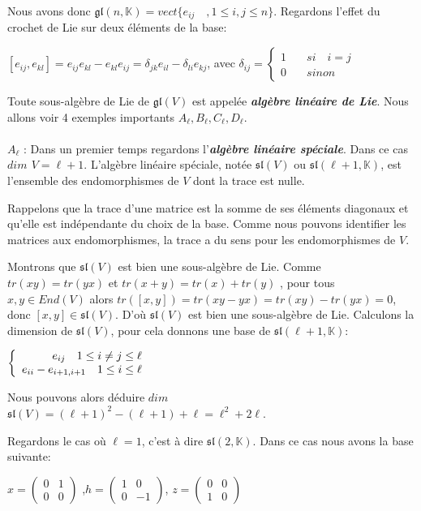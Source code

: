 \documentclass[a4paper,openany,12pt]{report}
\newcommand{\KK}{\mathbb{K}}
\newcommand{\gl}{\mathfrak{gl}}
\newcommand{\ssl}{\mathfrak{sl}}
\theoremstyle{break}
{\theorembodyfont{\upshape}
\newtheorem*{rmq}{Remarque :}
\newtheorem*{prv}{Preuve :}
\newtheorem*{ex}{Exemples :}
\newtheorem{exe}{Exemple : }
\newtheorem*{nota}{Notation :}}
\begin{document}
Nous avons donc $\gl(n,\KK)=vect\{ { e_{ij} \quad , 1\leq i , j \leq n }\}$. Regardons l'effet du crochet de Lie sur deux éléments de la base:
\begin{center}
$ [ e_{ij},e_{kl} ] = e_{ij} e_{kl} - e_{kl} e_{ij}  = \delta_{jk}e_{il}  -  \delta_{li}e_{kj} $, avec 
$ \delta_{ij} = \left \{
\begin{aligned}
1 & \quad si \quad i=j\\
0 & \quad sinon
\end{aligned}
\right. $
\end{center}
\quad Toute sous-algèbre de Lie de $\gl(V)$ est appelée \emph{\textbf{algèbre linéaire de Lie}}. Nous allons voir 4 exemples importants  $A_{\ell}, B_{\ell}, C_{\ell}, D_{\ell}$.\\
\\
$ A_{\ell} $ : Dans un premier temps regardons l'\emph{\textbf{algèbre linéaire spéciale}}. Dans ce cas \textbf{$dim$ $V= \ell +1$}. L'algèbre linéaire spéciale, notée $\ssl(V)$ ou $\ssl(\ell+1,\KK)$, est l'ensemble des endomorphismes de $V$ dont la trace est nulle.

Rappelons que la trace d'une matrice est la somme de ses éléments diagonaux et qu'elle est indépendante du choix de la base. Comme nous pouvons identifier les matrices aux endomorphismes, la trace a du sens pour les endomorphismes de $V$.

Montrons que $\ssl(V)$ est bien une sous-algèbre de Lie. Comme $tr(xy)=tr(yx)$ et $tr(x+y)= tr(x) + tr(y)$ ,  pour tous $x,y  \in End(V)$ alors $tr([x,y])=tr(xy-yx)=tr(xy)-tr(yx)=0$, donc $[x,y] \in \ssl(V)$.
D'où $\ssl(V)$ est bien une sous-algèbre de Lie. %
Calculons la dimension de $\ssl(V)$, pour cela donnons une base de $\ssl(\ell+1,\KK)$:
\begin{center}
$\left \{
   \begin{array}{r c l}
e_{ij }\quad 1\leq i \neq j \leq \ell \\
e_{ii}-e_{i+1,i+1} \quad 1\leq i \leq \ell
   \end{array}
   \right .$
\end{center}
Nous pouvons alors déduire $dim$ $\ssl(V) = (\ell + 1)^2 - (\ell + 1) + \ell = \ell^2+2\ell$.

\quad Regardons le cas où $\ell=1$, c'est à dire $\ssl(2,\KK)$. Dans ce cas nous avons la base suivante:
\begin{center}
$ x=\begin{pmatrix} 0 & 1 \\ 0 & 0 \end{pmatrix} $ ,\quad $ h=\begin{pmatrix} 1 & 0 \\ 0 & -1 \end{pmatrix} $, \quad $ z=\begin{pmatrix} 0 & 0 \\ 1 & 0 \end{pmatrix} $
\end{center}
\end{document}
